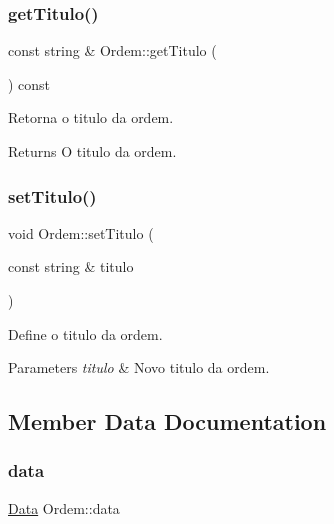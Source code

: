 \subsubsection{\texorpdfstring{get\+Titulo()}{getTitulo()}}
{\footnotesize\ttfamily const string \& Ordem\+::get\+Titulo (\begin{DoxyParamCaption}{ }\end{DoxyParamCaption}) const\hspace{0.3cm}{\ttfamily [inline]}}



Retorna o titulo da ordem. 

\begin{DoxyReturn}{Returns}
O titulo da ordem. 
\end{DoxyReturn}
\hypertarget{class_ordem_aa8e4bc7713526fe31d8129465e7ff72a}{}\label{class_ordem_aa8e4bc7713526fe31d8129465e7ff72a} 
\subsubsection{\texorpdfstring{set\+Titulo()}{setTitulo()}}
{\footnotesize\ttfamily void Ordem\+::set\+Titulo (\begin{DoxyParamCaption}\item[{const string \&}]{titulo }\end{DoxyParamCaption})\hspace{0.3cm}{\ttfamily [inline]}}



Define o titulo da ordem. 


\begin{DoxyParams}{Parameters}
{\em titulo} & Novo titulo da ordem. \\
\hline
\end{DoxyParams}


\subsection{Member Data Documentation}
\hypertarget{class_ordem_a9f4dbc2966e98dcbd7e300ae346d8535}{}\label{class_ordem_a9f4dbc2966e98dcbd7e300ae346d8535} 
\subsubsection{\texorpdfstring{data}{data}}
{\footnotesize\ttfamily \hyperlink{class_data}{Data} Ordem\+::data\hspace{0.3cm}{\ttfamily [protected]}}



